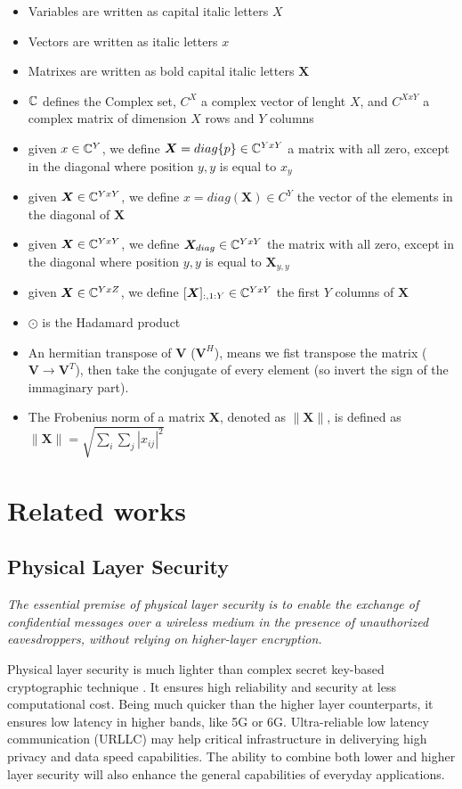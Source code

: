 \begin{itemize}
  \item Variables are written as capital italic letters $X$
  \item Vectors are written as italic letters $x$
  \item Matrixes are written as bold capital italic letters $\bm{X}$
  \item $\mathbb{C}$ defines the Complex set, $C^X$ a complex vector of lenght $X$, and $C^{XxY}$ a complex matrix of dimension $X$ rows and $Y$ columns
  \item given $x \in \mathbb{C}^Y$, we define $\bm{X} = diag\{p\} \in \mathbb{C}^{YxY}$ a matrix with all zero, except in the diagonal where position $y,y$ is equal to $x_y$
  \item given $\bm{X} \in \mathbb{C}^{YxY}$, we define $x = diag(\bm{X}) \in C^Y$ the vector of the elements in the diagonal of $\bm{X}$
  \item given $\bm{X} \in \mathbb{C}^{YxY}$, we define $\bm{X}_{diag} \in \mathbb{C}^{YxY}$ the matrix with all zero, except in the diagonal where position $y,y$ is equal to $\bm{X}_{y,y}$
  \item given $\bm{X} \in \mathbb{C}^{YxZ}$, we define $[\bm{X}]_{:,1:Y} \in \mathbb{C}^{YxY}$ the first $Y$ columns of $\bm{X}$
  \item $\odot$ is the Hadamard product
  \item An hermitian transpose of $\bm{V}$ ($\bm{V}^H$), means we fist transpose the matrix ($\bm{V} \rightarrow \bm{V}^T$), then take the conjugate of every element (so invert the sign of the immaginary part).
  \item The Frobenius norm of a matrix $\bm{X}$, denoted as $\|\bm{X}\|$, is defined as $\|\bm{X}\| = \sqrt{\sum_{i}\sum_{j} |x_{ij}|^2}$
\end{itemize}

\newpage
\section{Related works}
\subsection{Physical Layer Security}

\textit{The essential premise of physical layer security is to enable the exchange of confidential messages over a wireless medium in the presence of unauthorized eavesdroppers, without relying on higher-layer encryption.}\cite{6739367}

Physical layer security is much lighter than complex secret key-based cryptographic technique \cite{10599431}. It ensures high reliability and security at less computational cost. Being much quicker than the higher layer counterparts, it ensures low latency in higher bands, like 5G or 6G. Ultra-reliable low latency communication (URLLC) may help critical infrastructure in deliverying high privacy and data speed capabilities. The ability to combine both lower and higher layer security will also enhance the general capabilities of everyday applications.

